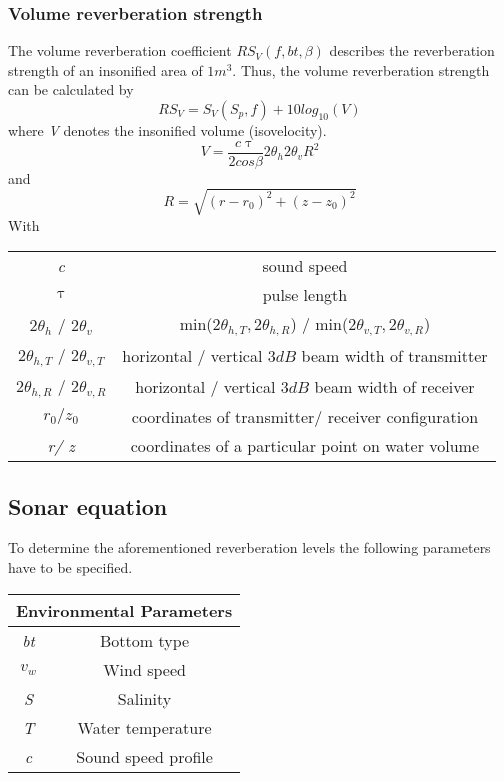 \subsubsection{ Volume reverberation strength } \label{ Volume reverberation strength }
\noindent The volume reverberation coefficient \textit{$RS_{V}(f,bt,\beta)$} describes the reverberation strength of an insonified area of $1 m^3.$ Thus, the volume reverberation strength can be calculated by
\begin{equation}
\textit{$RS_V$} = \textit{$S_{V}(S_p, f)$} + 10 log_{10}{(V)}
\end{equation}
\noindent where \textit{V} denotes the insonified volume (isovelocity).
\begin{equation}
\textit{V} = \frac{ c \uptau }{ 2 cos{\beta}} 2 \theta_{h} 2 \theta_{v} R^{2}
\end{equation}
\noindent and
\begin{equation}
\textit{R} = \sqrt{ (\textit{r} - \textit{$r_{0}$})^{2} + (\textit{z} - \textit{$z_{0}$})^{2} }
\end{equation}
\noindent With
\begin{center}
\begin{tabular}{ |c|c| } 
 \hline
  \textit{c} & sound speed  \\ 
  $\uptau$ & pulse length \\ 
  $2 \theta_{h}$ / $2 \theta_{v}$ & min($2\theta_{h,T}, 2\theta_{h,R}$) / min($2\theta_{v,T}, 2\theta_{v,R}$)  \\ 
  $2\theta_{h,T}$ / $2\theta_{v,T}$ &  horizontal / vertical $3 dB$ beam width of transmitter \\
  $2\theta_{h,R}$ / $2\theta_{v,R}$ & horizontal / vertical $3 dB$ beam width of receiver \\ 
  \textit{$r_0/ z_0$} & coordinates of transmitter/ receiver configuration \\
  \textit{r/ z} & coordinates of a particular point on water volume \\
  \hline
\end{tabular}
\end{center}

\newpage

\subsection{ Sonar equation } \label{ Sonar equation}
\noindent To determine the aforementioned reverberation levels the following parameters have to be specified.
\begin{center}
\begin{tabular}{ |c|c| } 
 \hline
 \multicolumn{2}{|c|}{Environmental Parameters} \\
 \hline
  \textit{bt} & Bottom type  \\ 
  \textit{$v_w$} & Wind speed  \\ 
  \textit{S} & Salinity  \\ 
  \textit{T} & Water temperature \\
  \textit{c} & Sound speed profile \\
  \hline
\end{tabular}
\end{center}

